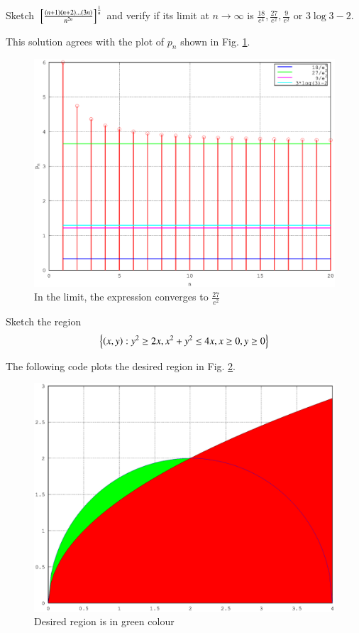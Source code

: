 \documentclass[journal,12pt,twocolumn]{IEEEtran}
\begin{document}
%
\begin{problem}
Sketch ${}\left[\frac{\left(n+1\right)\left(n+2\right)\dots \left(3n\right)}{n^{2n}}\right]^{\frac{1}{n}}$ and verify if its limit at $n \rightarrow \infty $ is $\frac{18}{e^4},\frac{27}{e^2},\frac{9}{e^2}$ or $3\log 3 -2$.
\end{problem}
\solution	

This solution agrees with the plot of $p_n$ shown in Fig. \ref{fig_32}.

%
\begin{figure}[h]
\centering
\includegraphics[width=\columnwidth]{./figs/ee16b1032}
\caption{ In the limit, the expression converges to $\frac{27}{e^2}$}
\label{fig_32}	
\end{figure}
%
\begin{problem}
Sketch the region 
\begin{equation*}
\left\{\left(x,y\right): y^2 \geq 2x, x^2+y^2 \leq 4x, x \geq 0, y \geq 0 \right\}
\end{equation*}
\end{problem}
\solution
The following code plots the desired region in Fig. \ref{fig_33}.

%
\begin{figure}[h]
\centering
\includegraphics[width=\columnwidth]{./figs/ee16b1033}
\caption{ Desired region is in green colour}
\label{fig_33}	
\end{figure}
\end{document}
